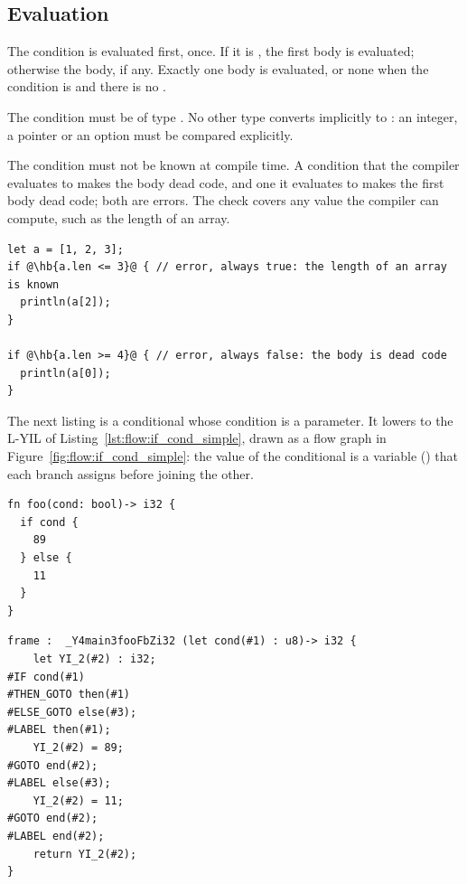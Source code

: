 \subsection{Evaluation}

The condition is evaluated first, once. If it is , the first body
is evaluated; otherwise the  body, if any. Exactly one body is
evaluated, or none when the condition is  and there is no
.

The condition must be of type . No other type converts implicitly to
: an integer, a pointer or an option must be compared explicitly.

The condition must not be known at compile time. A condition that the compiler
evaluates to  makes the  body dead code, and one it
evaluates to  makes the first body dead code; both are errors. The
check covers any value the compiler can compute, such as the length of an
array.

\begin{lstlisting}[style=coloredverbatimError, escapechar=@]
let a = [1, 2, 3];
if @\hb{a.len <= 3}@ { // error, always true: the length of an array is known
  println(a[2]);
}

if @\hb{a.len >= 4}@ { // error, always false: the body is dead code
  println(a[0]);
}
\end{lstlisting}

The next listing is a conditional whose condition is a parameter. It lowers to
the L-YIL of Listing~\ref{lst:flow:if_cond_simple}, drawn as a flow graph in
Figure~\ref{fig:flow:if_cond_simple}: the value of the conditional is a variable
() that each branch assigns before joining the other.

\begin{lstlisting}[style=coloredverbatim]
fn foo(cond: bool)-> i32 {
  if cond {
    89
  } else {
    11
  }
}
\end{lstlisting}

\begin{lstlisting}[style=lyilVerb, caption=Simple condition, label=lst:flow:if_cond_simple]
frame :  _Y4main3fooFbZi32 (let cond(#1) : u8)-> i32 {
    let YI_2(#2) : i32;
#IF cond(#1)
#THEN_GOTO then(#1)
#ELSE_GOTO else(#3);
#LABEL then(#1);
    YI_2(#2) = 89;
#GOTO end(#2);
#LABEL else(#3);
    YI_2(#2) = 11;
#GOTO end(#2);
#LABEL end(#2);
    return YI_2(#2);
}
\end{lstlisting}


